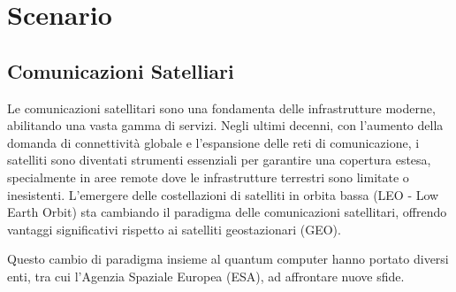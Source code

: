 
\chapter{Scenario} %

\label{Chapter3} %



\section{Comunicazioni Satelliari}

Le comunicazioni satellitari sono una fondamenta delle infrastrutture moderne, abilitando una vasta gamma di servizi.
Negli ultimi decenni, con l'aumento della domanda di connettività globale e l'espansione delle reti di comunicazione, i satelliti sono diventati strumenti essenziali per garantire una copertura estesa, specialmente in aree remote dove le infrastrutture terrestri sono limitate o inesistenti.
L'emergere delle costellazioni di satelliti in orbita bassa (LEO - Low Earth Orbit) sta cambiando il paradigma delle comunicazioni satellitari, offrendo vantaggi significativi rispetto ai satelliti geostazionari (GEO). 

Questo cambio di paradigma insieme al quantum computer hanno portato diversi enti, tra cui l'Agenzia Spaziale Europea (ESA), ad affrontare nuove sfide.

